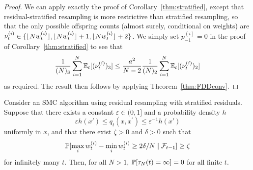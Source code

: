 \begin{proof}
We can apply exactly the proof of Corollary~\ref{thm:stratified}, except that residual-stratified resampling is more restrictive than stratified resampling, so that the only possible offspring counts (almost surely, conditional on weights) are $\nu_t^{(i)} \in \{ \lfloor N w_t^{(i)} \rfloor, \lfloor N w_t^{(i)} \rfloor +1, \lfloor N w_t^{(i)} \rfloor +2 \}$. We simply set $p_{-1}^{(i)} = 0$ in the proof of Corollary~\ref{thm:stratified} to see that
\begin{equation*}
\frac{1}{(N)_3} \sum_{i=1}^{N} \mathbb{E}_t [(\nu_t^{(i)})_3 ]
\leq \frac{a^2}{N-2} \frac{1}{(N)_2} \sum_{i=1}^{N} \mathbb{E}_t [(\nu_t^{(i)})_2 ]
\end{equation*}
as required.
The result then follows by applying Theorem~\ref{thm:FDDconv}.
\end{proof}

\begin{prop}\label{thm:resstrat_nontriviality}
Consider an SMC algorithm using residual resampling with stratified residuals.
Suppose that there exists a constant $\varepsilon \in (0,1]$ and a probability density $h$
\begin{equation*}
\varepsilon h(x') \leq q_t(x, x^\prime) \leq \varepsilon^{-1} h(x')
\end{equation*}
uniformly in $x$, and that there exist $\zeta >0$ and $\delta >0$ such that 
\begin{equation*}
\mathbb{P}[ \max_i w_t^{(i)} - \min_i w_t^{(i)} \geq 2\delta/N \mid \mathcal{F}_{t-1} ] \geq \zeta
\end{equation*}
 for infinitely many $t$. Then, for all $N>1$, $\mathbb{P}[ \tau_N(t) = \infty ] =0$ for all finite $t$.
\end{prop}

